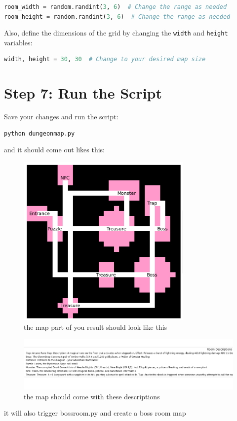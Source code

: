 \documentclass[10pt,twocolumn]{article}
\begin{document}
\begin{lstlisting}[language=Python]
room_width = random.randint(3, 6)  # Change the range as needed
room_height = random.randint(3, 6)  # Change the range as needed
\end{lstlisting}

Also, define the dimensions of the grid by changing the \texttt{width} and \texttt{height} variables:

\begin{lstlisting}[language=Python]
width, height = 30, 30  # Change to your desired map size
\end{lstlisting}

\section{Step 7: Run the Script}

Save your changes and run the script:

\begin{lstlisting}[language=bash]
python dungeonmap.py
\end{lstlisting}
and it should come out likes this:
\begin{figure}
    \centering
    \includegraphics[width=0.5\linewidth]{example1.png}
    \caption{the map part of you result should look like this}
    \label{fig:enter-label}
\end{figure}

\begin{figure}
    \centering
    \includegraphics[width=0.5\linewidth]{decs.png}
    \caption{the map should come with these descriptions}
    \label{fig:enter-label}
\end{figure}
it will also trigger bossroom.py and create a boss room map
\end{document}
